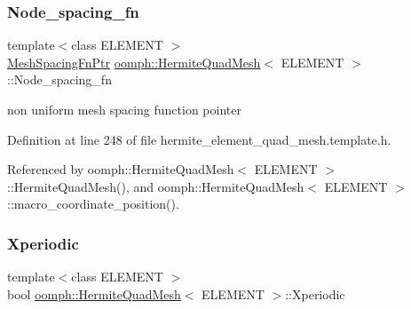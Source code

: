 \mbox{\label{classoomph_1_1HermiteQuadMesh_a3b3cc55576538fc29e6975def870536f}} 
\subsubsection{\texorpdfstring{Node\+\_\+spacing\+\_\+fn}{Node\_spacing\_fn}}
{\footnotesize\ttfamily template$<$class E\+L\+E\+M\+E\+NT $>$ \\
\hyperlink{classoomph_1_1HermiteQuadMesh_abebf4806b300591f976398404ed0ef3f}{Mesh\+Spacing\+Fn\+Ptr} \hyperlink{classoomph_1_1HermiteQuadMesh}{oomph\+::\+Hermite\+Quad\+Mesh}$<$ E\+L\+E\+M\+E\+NT $>$\+::Node\+\_\+spacing\+\_\+fn\hspace{0.3cm}{\ttfamily [private]}}



non uniform mesh spacing function pointer 



Definition at line 248 of file hermite\+\_\+element\+\_\+quad\+\_\+mesh.\+template.\+h.



Referenced by oomph\+::\+Hermite\+Quad\+Mesh$<$ E\+L\+E\+M\+E\+N\+T $>$\+::\+Hermite\+Quad\+Mesh(), and oomph\+::\+Hermite\+Quad\+Mesh$<$ E\+L\+E\+M\+E\+N\+T $>$\+::macro\+\_\+coordinate\+\_\+position().

\mbox{\label{classoomph_1_1HermiteQuadMesh_af1c2c974dc0d2e599b6bbe3921c5bb77}} 
\subsubsection{\texorpdfstring{Xperiodic}{Xperiodic}}
{\footnotesize\ttfamily template$<$class E\+L\+E\+M\+E\+NT $>$ \\
bool \hyperlink{classoomph_1_1HermiteQuadMesh}{oomph\+::\+Hermite\+Quad\+Mesh}$<$ E\+L\+E\+M\+E\+NT $>$\+::Xperiodic\hspace{0.3cm}{\ttfamily [private]}}



